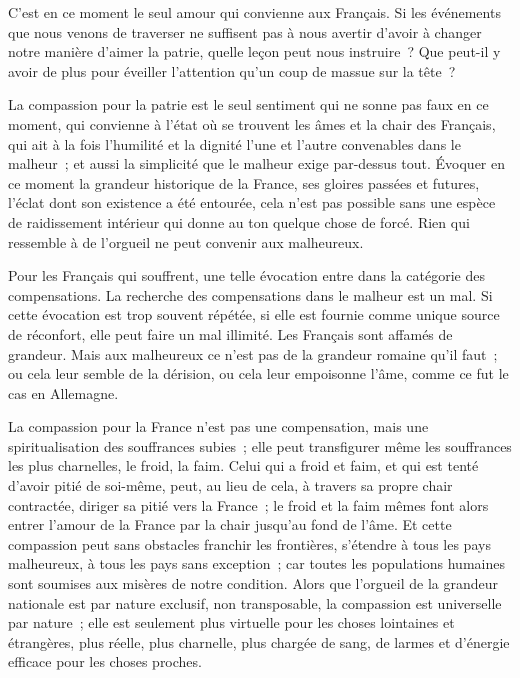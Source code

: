 \documentclass[french,twoside]{book} %
\begin{document}
C'est en ce moment le seul amour qui convienne aux Français. Si les événements que nous venons de traverser ne suffisent pas à nous avertir d'avoir à changer notre manière d'aimer la patrie, quelle leçon peut nous instruire ? Que peut-il y avoir de plus pour éveiller l'attention qu'un coup de massue sur la tête ?\par
La compassion pour la patrie est le seul sentiment qui ne sonne pas faux en ce moment, qui convienne à l'état où se trouvent les âmes et la chair des Français, qui ait à la fois l'humilité et la dignité l'une et l'autre convenables dans le malheur ; et aussi la simplicité que le malheur exige par-dessus tout. Évoquer en ce moment la grandeur historique de la France, ses gloires passées et futures, l'éclat dont son existence a été entourée, cela n'est pas possible sans une espèce de raidissement intérieur qui donne au ton quelque chose de forcé. Rien qui ressemble à de l'orgueil ne peut convenir aux malheureux.\par
Pour les Français qui souffrent, une telle évocation entre dans la catégorie des compensations. La recherche des compensations dans le malheur est un mal. Si cette évocation est trop souvent répétée, si elle est fournie comme unique source de réconfort, elle peut faire un mal illimité. Les Français sont affamés de grandeur. Mais aux malheureux ce n'est pas de la grandeur romaine qu'il faut ; ou cela leur semble de la dérision, ou cela leur empoisonne l'âme, comme ce fut le cas en Allemagne.\par
La compassion pour la France n'est pas une compensation, mais une spiritualisation des souffrances subies ; elle peut transfigurer même les souffrances les plus charnelles, le froid, la faim. Celui qui a froid et faim, et qui est tenté d'avoir pitié de soi-même, peut, au lieu de cela, à travers sa propre chair contractée, diriger sa pitié vers la France ; le froid et la faim mêmes font alors entrer l'amour de la France par la chair jusqu'au fond de l'âme. Et cette compassion peut sans obstacles franchir les frontières, s'étendre à tous les pays malheureux, à tous les pays sans exception ; car toutes les populations humaines sont soumises aux misères de notre condition. Alors que l'orgueil de la grandeur nationale est par nature exclusif, non transposable, la compassion est universelle par nature ; elle est seulement plus virtuelle pour les choses lointaines et étrangères, plus réelle, plus charnelle, plus chargée de sang, de larmes et d'énergie efficace pour les choses proches.\par
\end{document}
